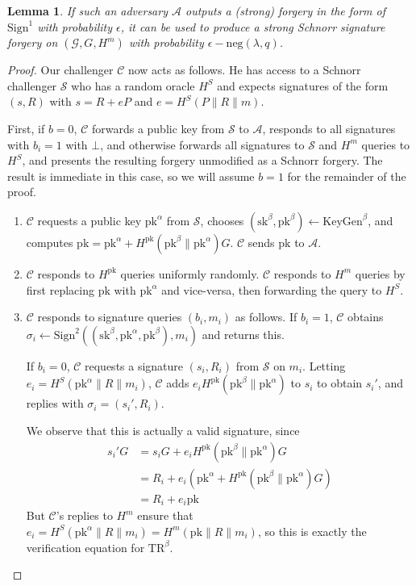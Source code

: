 \documentclass[letterpaper]{article}
\newtheorem{lmma}{Lemma}
\newcommand{\TR}[1]{\mathrm{TR}^{#1}}
\newcommand{\KeyGen}{\mathrm{KeyGen}}
\newcommand{\Sign}{\mathrm{Sign}}
\newcommand{\sk}{\mathrm{sk}}
\newcommand{\pk}{\mathrm{pk}}
\newcommand{\negl}{\mathrm{neg}}
\begin{document}
\begin{lmma} If such an adversary $\mathcal{A}$ outputs a (strong) forgery in
the form of $\Sign^1$ with probability $\epsilon$, it can be used to produce a
strong Schnorr signature forgery on $(\mathcal{G}, G, H^m)$ with probability
$\epsilon-\negl(\lambda,q)$.
\end{lmma}

\begin{proof}
Our challenger $\mathcal{C}$ now acts as follows. He has access to a Schnorr
challenger $\mathcal{S}$ who has a random oracle $H^S$ and expects signatures
of the form $(s, R)$ with $s = R + eP$ and $e = H^S(P\|R\|m)$.

First, if $b=0$, $\mathcal{C}$ forwards a public key from $\mathcal{S}$ to
$\mathcal{A}$, responds to all signatures with $b_i=1$ with $\bot$, and otherwise forwards all signatures to $\mathcal{S}$ and $H^m$ queries
to $H^S$, and presents the resulting forgery unmodified as a Schnorr forgery.
The result is immediate in this case, so we will assume $b=1$ for the
remainder of the proof.

\begin{enumerate}
\item $\mathcal{C}$ requests a public key $\pk^\alpha$ from $\mathcal{S}$,
chooses $(\sk^\beta, \pk^\beta)\gets\KeyGen^\beta$, and computes
$\pk=\pk^\alpha+H^\pk(\pk^\beta\|\pk^\alpha)G$. $\mathcal{C}$ sends $\pk$ to
$\mathcal{A}$.

\item $\mathcal{C}$ responds to $H^\pk$ queries uniformly randomly. $\mathcal{C}$
responds to $H^m$ queries by first replacing $\pk$ with $\pk^\alpha$
and vice-versa, then forwarding the query to $H^S$.

\item $\mathcal{C}$ responds to signature queries $(b_i, m_i)$ as follows. If $b_i=1$,
$\mathcal{C}$ obtains $\sigma_i\gets\Sign^2((\sk^\beta, \pk^\alpha,\pk^\beta), m_i)$
and returns this.

If $b_i=0$, $\mathcal{C}$ requests a signature $(s_i,R_i)$ from $\mathcal{S}$ on $m_i$.
Letting $e_i=H^S(\pk^\alpha\|R\|m_i)$, $\mathcal{C}$ adds $e_iH^\pk(\pk^\beta\|\pk^\alpha)$
to $s_i$ to obtain $s_i'$, and replies with $\sigma_i = (s_i', R_i)$.

We observe that this is actually a valid signature, since
\begin{align*}
s_i'G
    &= s_iG + e_iH^\pk(\pk^\beta\|\pk^\alpha)G	\\
    &= R_i + e_i(\pk^\alpha + H^\pk(\pk^\beta\|\pk^\alpha)G)	\\
    &= R_i + e_i\pk
\end{align*}
But $\mathcal{C}$'s replies to $H^m$ ensure that $e_i=H^S(\pk^\alpha\|R\|m_i)
=H^m(\pk\|R\|m_i)$, so this is exactly the verification equation for
$\TR\beta$.


\end{enumerate}
\end{proof}
\end{document}
